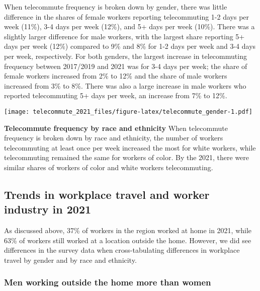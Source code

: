 \documentclass[
  12pt,
]{article}
\begin{document}
\begin{flushleft}
When telecommute frequency is broken down by gender, there was little difference in the shares of female workers reporting telecommuting 1-2 days per week (11\%), 3-4 days per week (12\%), and 5+ days per week (10\%). There was a slightly larger difference for male workers, with the largest share reporting 5+ days per week (12\%) compared to 9\% and 8\% for 1-2 days per week and 3-4 days per week, respectively. For both genders, the largest increase in telecommuting frequency between 2017/2019 and 2021 was for 3-4 days per week; the share of female workers increased from 2\% to 12\% and the share of male workers increased from 3\% to 8\%. There was also a large increase in male workers who reported telecommuting 5+ days per week, an increase from 7\% to 12\%.
\end{flushleft}

\texttt{[image: telecommute\_2021\_files/figure-latex/telecommute\_gender-1.pdf]}

\begin{flushleft}
\textbf{Telecommute frequency by race and ethnicity}
When telecommute frequency is broken down by race and ethnicity, the number of workers telecommuting at least once per week increased the most for white workers, while telecommuting remained the same for workers of color. By the 2021, there were similar shares of workers of color and white workers telecommuting.
\end{flushleft}

\hypertarget{trends-in-workplace-travel-and-worker-industry-in-2021}{%
\subsection{Trends in workplace travel and worker industry in
2021}\label{trends-in-workplace-travel-and-worker-industry-in-2021}}

\begin{flushleft}
As discussed above, 37\% of workers in the region worked at home in 2021, while 63\% of workers still worked at a location outside the home. However, we did see differences in the survey data when cross-tabulating differences in workplace travel by gender and by race and ethnicity.
\end{flushleft}

\hypertarget{men-working-outside-the-home-more-than-women}{%
\subsubsection{Men working outside the home more than
women}\label{men-working-outside-the-home-more-than-women}}
\end{document}
